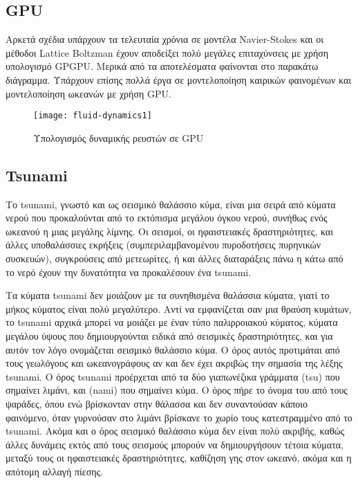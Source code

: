 \subsection{GPU}
Αρκετά σχέδια υπάρχουν τα τελευταία χρόνια σε μοντέλα Navier-Stokes και οι μέθοδοι Lattice Boltzman έχουν αποδείξει πολύ μεγάλες επιταχύνσεις με χρήση υπολογισμό GPGPU. Μερικά από τα αποτελέσματα φαίνονται στο παρακάτω διάγραμμα. Υπάρχουν επίσης πολλά έργα σε μοντελοποίηση καιρικών φαινομένων και μοντελοποίηση ωκεανών με χρήση GPU.

\begin{figure}[h]
\centering
\hspace*{-0.5in}
\texttt{[image: fluid-dynamics1]}
\caption{Υπολογισμός δυναμικής ρευστών σε GPU}
\end{figure}
 
\subsection{Tsunami}
Το tsunami, γνωστό και ως σεισμικό θαλάσσιο κύμα, είναι μια σειρά από κύματα νερού που προκαλούνται από το εκτόπισμα μεγάλου όγκου νερού, συνήθως ενός ωκεανού η μιας μεγάλης λίμνης. Οι σεισμοί, οι ηφαιστειακές δραστηριότητες, και άλλες υποθαλάσσιες εκρήξεις (συμπεριλαμβανομένου πυροδοτήσεις πυρηνικών συσκευών), συγκρούσεις από μετεωρίτες, ή και άλλες διαταράξεις πάνω η κάτω από το νερό έχουν την δυνατότητα να προκαλέσουν ένα tsunami.

Τα κύματα tsunami δεν μοιάζουν με τα συνηθισμένα θαλάσσια κύματα, γιατί το μήκος κύματος είναι πολύ μεγαλύτερο. Αντί να εμφανίζεται σαν μια θραύση κυμάτων, το tsunami αρχικά μπορεί να μοιάζει με έναν τύπο παλιρροιακού κύματος,  κύματα μεγάλου ύψους που δημιουργούνται ειδικά από σεισμικές δραστηριότητες, και για αυτόν τον λόγο ονομάζεται σεισμικό θαλάσσιο κύμα. Ο όρος αυτός προτιμάται από τους γεωλόγους και ωκεανογράφους αν και δεν έχει ακριβώς την σημασία της λέξης tsunami. Ο όρος tsunami προέρχεται από τα δύο γιαπωνέζικα γράμματα {\large{}}(tsu) που σημαίνει λιμάνι, και {\large{}}(nami) που σημαίνει κύμα. Ο όρος πήρε το όνομα του από τους ψαράδες, όπου ενώ βρίσκονταν στην θάλασσα και δεν συναντούσαν κάποιο φαινόμενο, όταν γυρνούσαν στο λιμάνι βρίσκανε το χωρίο τους κατεστραμμένο από το tsunami. Ακόμα και ο όρος σεισμικό θαλάσσιο κύμα δεν είναι πολύ ακριβής, καθώς άλλες δυνάμεις εκτός από τους σεισμούς μπορούν να δημιουργήσουν τέτοια κύματα, μεταξύ τους οι ηφαιστειακές δραστηριότητες, καθίζηση γης στον ωκεανό, ακόμα και η απότομη αλλαγή πίεσης.
 
